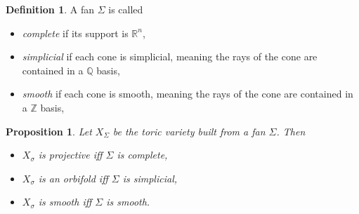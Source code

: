 \documentclass{article}
\newtheorem{prop}[theorem]{Proposition}
\theoremstyle{definition}
\newtheorem{definition}[theorem]{Definition}
\theoremstyle{remark}
\numberwithin{theorem}{section}
\newenvironment{defn}{
	\begin{mdframed}
		\vspace{-0.5em}
		\begin{definition}
		}{
		\end{definition}
	\end{mdframed}
}
\begin{document}
	\begin{defn}
		A fan $\Sigma$ is called
		\begin{itemize}
			\item \emph{complete} if its support is $\mathbb{R}^n$,
			\item \emph{simplicial} if each cone is simplicial, meaning the rays of the cone are contained in a $\mathbb{Q}$ basis,
			\item \emph{smooth} if each cone is smooth, meaning the rays of the cone are contained in a $\mathbb{Z}$ basis,
		\end{itemize}
	\end{defn}
	\begin{prop}
		Let $X_\Sigma$ be the toric variety built from a fan $\Sigma$. Then
		\begin{itemize}
			\item $X_\sigma$ is projective iff $\Sigma$ is complete,
			\item $X_\sigma$ is an orbifold iff $\Sigma$ is simplicial,
			\item $X_\sigma$ is smooth iff $\Sigma$ is smooth.
		\end{itemize}
	\end{prop}
\end{document}
